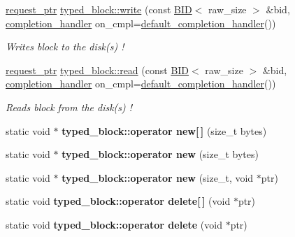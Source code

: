 \begin{CompactItemize}
\item 
\hyperlink{classrequest__ptr}{request\_\-ptr} \hyperlink{group__mnglayer_gc9c8caa89ae04a3b8dc3d1793eda61b0}{typed\_\-block::write} (const \hyperlink{structBID}{BID}$<$ raw\_\-size $>$ \&bid, \hyperlink{classcompletion__handler}{completion\_\-handler} on\_\-cmpl=\hyperlink{structdefault__completion__handler}{default\_\-completion\_\-handler}())
\begin{CompactList}\small\item\em Writes block to the disk(s) ! \item\end{CompactList}\item 
\hyperlink{classrequest__ptr}{request\_\-ptr} \hyperlink{group__mnglayer_ge5f58b3358b383d44832ce0fbef7e015}{typed\_\-block::read} (const \hyperlink{structBID}{BID}$<$ raw\_\-size $>$ \&bid, \hyperlink{classcompletion__handler}{completion\_\-handler} on\_\-cmpl=\hyperlink{structdefault__completion__handler}{default\_\-completion\_\-handler}())
\begin{CompactList}\small\item\em Reads block from the disk(s) ! \item\end{CompactList}\item 
\hypertarget{group__mnglayer_gfb2c22d3b5ab3c33b98bc3fd71b4b940}{
static void $\ast$ \textbf{typed\_\-block::operator new\mbox{[}$\,$\mbox{]}} (size\_\-t bytes)}
\label{group__mnglayer_gfb2c22d3b5ab3c33b98bc3fd71b4b940}

\item 
\hypertarget{group__mnglayer_gf322e446d29d36fe3e8687bff69bbd21}{
static void $\ast$ \textbf{typed\_\-block::operator new} (size\_\-t bytes)}
\label{group__mnglayer_gf322e446d29d36fe3e8687bff69bbd21}

\item 
\hypertarget{group__mnglayer_g46a01a83f3954057c367a23a1e4f0e02}{
static void $\ast$ \textbf{typed\_\-block::operator new} (size\_\-t, void $\ast$ptr)}
\label{group__mnglayer_g46a01a83f3954057c367a23a1e4f0e02}

\item 
\hypertarget{group__mnglayer_g8c64f56092ff568bad31293b1ccdab53}{
static void \textbf{typed\_\-block::operator delete\mbox{[}$\,$\mbox{]}} (void $\ast$ptr)}
\label{group__mnglayer_g8c64f56092ff568bad31293b1ccdab53}

\item 
\hypertarget{group__mnglayer_g6c881aecb0a7b2e3c306c3d47e846140}{
static void \textbf{typed\_\-block::operator delete} (void $\ast$ptr)}
\label{group__mnglayer_g6c881aecb0a7b2e3c306c3d47e846140}


\end{CompactItemize}
